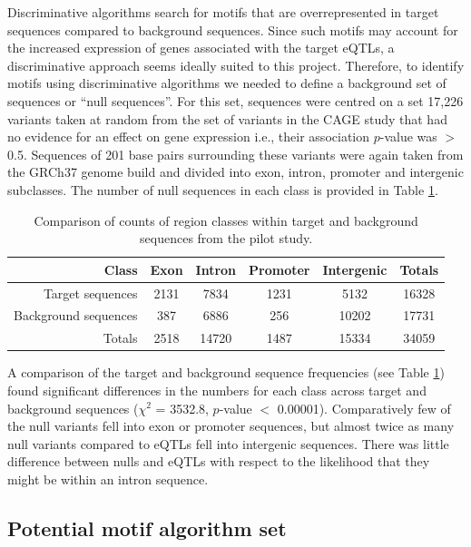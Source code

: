 \documentclass[12pt]{article}
\begin{document}
Discriminative algorithms search for motifs that are overrepresented in target sequences compared to background sequences. Since such motifs may account for the increased expression of genes associated with the target eQTLs, a discriminative approach seems ideally suited to this project.  Therefore, to identify motifs using discriminative algorithms we needed to define a background set of sequences or ``null sequences''. For this set, sequences were centred on a set 17,226 variants taken at random from the set of variants in the CAGE study that had no evidence for an effect on gene expression i.e., their association $p$-value was $>$ 0.5. Sequences of 201 base pairs surrounding these variants were again taken from the GRCh37 genome build and divided into exon, intron, promoter and intergenic subclasses. The number of null sequences in each class is provided in Table \ref{freqComparisons}. 

\begin{table}[!htbp]
\centering
\caption{Comparison of counts of region classes within target and background sequences from the pilot study.}\label{freqComparisons}
\begin{tabular}{rccccc}
 \toprule[0.2em]
Class & Exon & Intron & Promoter & Intergenic & Totals\\ 
\midrule[0.1em]
Target sequences & 2131 & 7834 & 1231 & 5132 & 16328\\
Background sequences & 387 & 6886 & 256 & 10202 & 17731\\
Totals & 2518 & 14720 & 1487 & 15334 & 34059\\
\bottomrule[0.2em]
\end{tabular}
\end{table} 
\newpage

A comparison of the target and background sequence frequencies (see Table \ref{freqComparisons}) found significant differences in the numbers for each class across target and background sequences ($\chi^2$ = 3532.8, $p$-value $<$ 0.00001). Comparatively few of the null variants fell into exon or promoter sequences, but almost twice as many null variants compared to eQTLs fell into intergenic sequences. There was little difference between nulls and eQTLs with respect to the likelihood that they might be within an intron sequence.


 
\subsection{Potential motif algorithm set}
\end{document}
